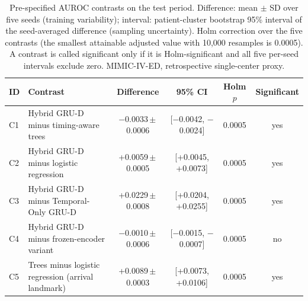 \begin{table}[t]
\centering
\caption{Pre-specified AUROC contrasts on the test period. Difference: mean $\pm$ SD over five seeds (training variability); interval: patient-cluster bootstrap 95\% interval of the seed-averaged difference (sampling uncertainty). Holm correction over the five contrasts (the smallest attainable adjusted value with 10,000 resamples is 0.0005). A contrast is called significant only if it is Holm-significant and all five per-seed intervals exclude zero. MIMIC-IV-ED, retrospective single-center proxy.}
\label{tab:contrasts}
\begin{tabular}{llcccc}
\toprule
ID & Contrast & Difference & 95\% CI & Holm $p$ & Significant \\
\midrule
C1 & Hybrid GRU-D minus timing-aware trees & \ensuremath{-}0.0033\,$\pm$\,0.0006 & [\ensuremath{-}0.0042, \ensuremath{-}0.0024] & 0.0005 & yes \\
C2 & Hybrid GRU-D minus logistic regression & +0.0059\,$\pm$\,0.0005 & [+0.0045, +0.0073] & 0.0005 & yes \\
C3 & Hybrid GRU-D minus Temporal-Only GRU-D & +0.0229\,$\pm$\,0.0008 & [+0.0204, +0.0255] & 0.0005 & yes \\
C4 & Hybrid GRU-D minus frozen-encoder variant & \ensuremath{-}0.0010\,$\pm$\,0.0006 & [\ensuremath{-}0.0015, \ensuremath{-}0.0007] & 0.0005 & no \\
C5 & Trees minus logistic regression (arrival landmark) & +0.0089\,$\pm$\,0.0003 & [+0.0073, +0.0106] & 0.0005 & yes \\
\bottomrule
\end{tabular}
\end{table}
